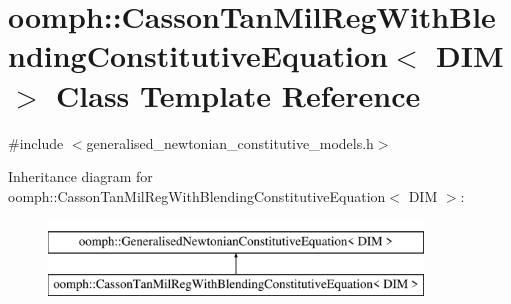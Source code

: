\hypertarget{classoomph_1_1CassonTanMilRegWithBlendingConstitutiveEquation}{}\section{oomph\+:\+:Casson\+Tan\+Mil\+Reg\+With\+Blending\+Constitutive\+Equation$<$ D\+IM $>$ Class Template Reference}
\label{classoomph_1_1CassonTanMilRegWithBlendingConstitutiveEquation}


{\ttfamily \#include $<$generalised\+\_\+newtonian\+\_\+constitutive\+\_\+models.\+h$>$}

Inheritance diagram for oomph\+:\+:Casson\+Tan\+Mil\+Reg\+With\+Blending\+Constitutive\+Equation$<$ D\+IM $>$\+:\begin{figure}[H]
\begin{center}
\leavevmode
\includegraphics[height=2.000000cm]{classoomph_1_1CassonTanMilRegWithBlendingConstitutiveEquation}
\end{center}
\end{figure}
